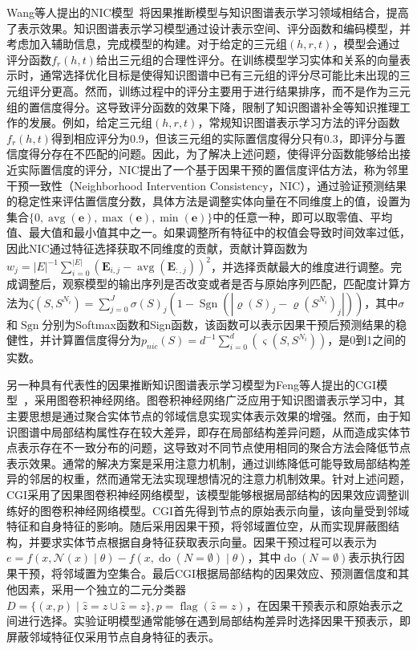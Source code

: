 \documentclass[algorithmlist, AutoFakeBold, AutoFakeSlant, figurelist, tablelist, nomlist, engineering]{seuthesix}
\begin{document}
Wang等人提出的NIC模型~\cite{wang2021neighborhood}将因果推断模型与知识图谱表示学习领域相结合，提高了表示效果。知识图谱表示学习模型通过设计表示空间、评分函数和编码模型，并考虑加入辅助信息，完成模型的构建。对于给定的三元组$(h, r, t)$，模型会通过评分函数$f_r\left(h, t\right)$给出三元组的合理性评分。在训练模型学习实体和关系的向量表示时，通常选择优化目标是使得知识图谱中已有三元组的评分尽可能比未出现的三元组评分更高。然而，训练过程中的评分主要用于进行结果排序，而不是作为三元组的置信度得分。这导致评分函数的效果下降，限制了知识图谱补全等知识推理工作的发展。例如，给定三元组$(h, r, t)$，常规知识图谱表示学习方法的评分函数$f_r\left(h, t\right)$得到相应评分为0.9，但该三元组的实际置信度得分只有0.3，即评分与置信度得分存在不匹配的问题。因此，为了解决上述问题，使得评分函数能够给出接近实际置信度的评分，NIC提出了一个基于因果干预的置信度评估方法，称为邻里干预一致性（Neighborhood Intervention Consistency，NIC），通过验证预测结果的稳定性来评估置信度分数，具体方法是调整实体向量在不同维度上的值，设置为集合$\{0, \operatorname{avg}(\bm{e}), \max (\bm{e}), \min (\bm{e})\}$中的任意一种，即可以取零值、平均值、最大值和最小值其中之一。如果调整所有特征中的权值会导致时间效率过低，因此NIC通过特征选择获取不同维度的贡献，贡献计算函数为$w_j=|E|^{-1} \sum_{i=0}^{|E|}\left(\mathbf{E}_{i, j}-\operatorname{avg}\left(\mathbf{E}_{:, j}\right)\right)^2$，并选择贡献最大的维度进行调整。完成调整后，观察模型的输出序列是否改变或者是否与原始序列匹配，匹配度计算方法为$\zeta\left(S, S^{N_i}\right)=\sum_{j=0}^J \sigma(S)_j\left(1-\operatorname{Sgn}\left(\left|\varrho(S)_j-\varrho\left(S^{N_i}\right)_j\right|\right)\right)$，其中$\sigma$和$\operatorname{Sgn}$分别为Softmax函数和Sign函数，该函数可以表示因果干预后预测结果的稳健性，并计算置信度得分为$p_{n i c}(S)=d^{-1} \sum_{i=0}^d\left(\varsigma\left(S, S^{N_i}\right)\right)$，是0到1之间的实数。

另一种具有代表性的因果推断知识图谱表示学习模型为Feng等人提出的CGI模型~\cite{feng2021should}，采用图卷积神经网络。图卷积神经网络广泛应用于知识图谱表示学习中，其主要思想是通过聚合实体节点的邻域信息实现实体表示效果的增强。然而，由于知识图谱中局部结构属性存在较大差异，即存在局部结构差异问题，从而造成实体节点表示存在不一致分布的问题，这导致对不同节点使用相同的聚合方法会降低节点表示效果。通常的解决方案是采用注意力机制，通过训练降低可能导致局部结构差异的邻居的权重，然而通常无法实现理想情况的注意力机制效果。针对上述问题，CGI采用了因果图卷积神经网络模型，该模型能够根据局部结构的因果效应调整训练好的图卷积神经网络模型。CGI首先得到节点的原始表示向量，该向量受到邻域特征和自身特征的影响。随后采用因果干预，将邻域置位空，从而实现屏蔽图结构，并要求实体节点根据自身特征获取表示向量。因果干预过程可以表示为$e=f(x, \mathcal{N}(x) \mid \theta)-f(x, \operatorname{do}(N=\emptyset) \mid \theta)$，其中$\operatorname{do}(N=\emptyset)$表示执行因果干预，将邻域置为空集合。最后CGI根据局部结构的因果效应、预测置信度和其他因素，采用一个独立的二元分类器$D=\{(x, p) \mid \hat{z}=z \cup \hat{z}=z\}, p=\operatorname{flag}(\hat{z}=z)$，在因果干预表示和原始表示之间进行选择。实验证明模型通常能够在遇到局部结构差异时选择因果干预表示，即屏蔽邻域特征仅采用节点自身特征的表示。
\end{document}
